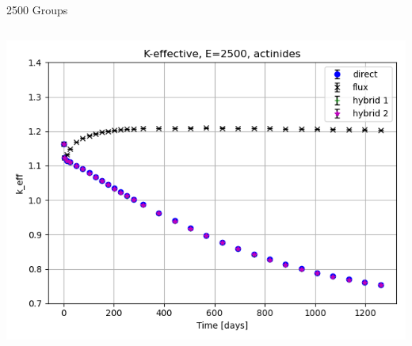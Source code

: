 \documentclass[
	11pt, %
	aspectratio=169, %
]{beamer}
\begin{document}
\begin{frame}{2500 Groups}
	\begin{columns}[c] %
		\begin{column}{0.32\textwidth} %
			\includegraphics[width=\textwidth]{../figures/keff/keff_actinides_2500.png}


\end{column}
\end{columns}
\end{frame}
\end{document}

